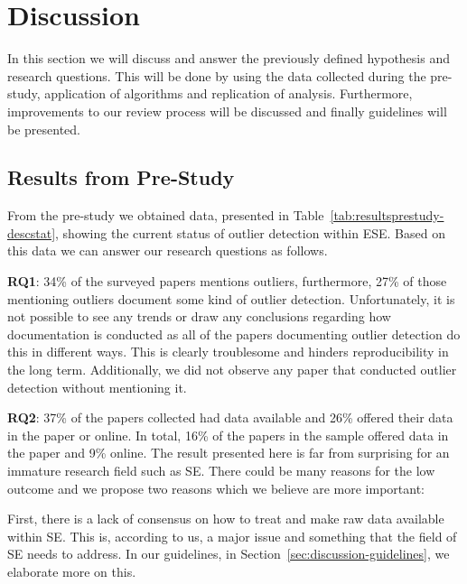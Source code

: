 ﻿\section{Discussion}
\label{sec:discussion}
In this section we will discuss and answer the previously defined hypothesis and research questions. This will be done by using the data collected during the pre-study, application of algorithms and replication of analysis. Furthermore, improvements to our review process will be discussed and finally guidelines will be presented.


\subsection{Results from Pre-Study}
\label{sec:discussion-resultsprestudy}
From the pre-study we obtained data, presented in Table~\ref{tab:resultsprestudy-descstat}, showing the current status of outlier detection within ESE. Based on this data we can answer our research questions as follows.


\textbf{RQ1}: 34\% of the surveyed papers mentions outliers, furthermore, 27\% of those mentioning outliers document some kind of outlier detection. Unfortunately, it is not possible to see any trends or draw any conclusions regarding how documentation is conducted as all of the papers documenting outlier detection do this in different ways. This is clearly troublesome and hinders reproducibility in the long term. Additionally, we did not observe any paper that conducted outlier detection without mentioning it.


\textbf{RQ2}: 37\% of the papers collected had data available and 26\% offered their data in the paper or online. In total, 16\% of the papers in the sample offered data in the paper and 9\% online. The result presented here is far from surprising for an immature research field such as SE\@. There could be many reasons for the low outcome and we propose two reasons which we believe are more important: 


First, there is a lack of consensus on how to treat and make raw data available within SE\@. This is, according to us, a major issue and something that the field of SE needs to address. In our guidelines, in Section~\ref{sec:discussion-guidelines}, we elaborate more on this.


